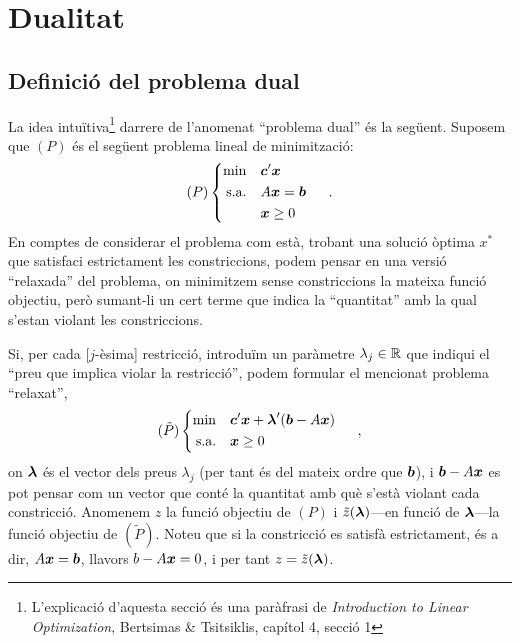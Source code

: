 \chapter{Dualitat}

\section{Definició del problema dual}

La idea intuïtiva\footnote{L'explicació d'aquesta secció és una paràfrasi de \textit{Introduction to Linear Optimization}, Bertsimas \& Tsitsiklis, capítol 4, secció 1} darrere de l'anomenat ``problema dual'' és la següent. Suposem que $(P)$ és el següent problema lineal de minimització:
\[
	(P)
	\begin{cases}
	\begin{aligned}
	\min 			&&& \boldsymbol{c}'\boldsymbol{x}\\
	\text{s.a.}		&&& A\boldsymbol{x} = \boldsymbol{b}\\
	&&& \boldsymbol{x}\ge0
	\end{aligned}
	\end{cases}\ .
\]
En comptes de considerar el problema com està, trobant una solució òptima $x^\ast$ que satisfaci estrictament les constriccions, podem pensar en una versió ``relaxada'' del problema, on minimitzem sense constriccions la mateixa funció objectiu, però sumant-li un cert terme que indica la ``quantitat'' amb la qual s'estan violant les constriccions. 

Si, per cada [$j$-èsima] restricció, introduïm un paràmetre $\lambda_j\in\mathbb{R}$ que indiqui el ``preu que implica violar la restricció'', podem formular el mencionat problema ``relaxat'',
\[
	(\tilde{P})
	\begin{cases}
	\begin{aligned}
	\min 			&&& \boldsymbol{c}'\boldsymbol{x} + \boldsymbol{\lambda}'(\boldsymbol{b}-A\boldsymbol{x})\\
	\text{s.a.}		&&& \boldsymbol{x} \ge 0\\
	\end{aligned}
	\end{cases}\ ,
\]
on $\boldsymbol{\lambda}$ és el vector dels preus $\lambda_j$ (per tant és del mateix ordre que $\boldsymbol{b}$), i $\boldsymbol{b}-A\boldsymbol{x}$ es pot pensar com un vector que conté la quantitat amb què s'està violant cada constricció. Anomenem $z$ la funció objectiu de $(P)$ i $\tilde{z}(\boldsymbol{\lambda})$---en funció de $\boldsymbol{\lambda}$---la funció objectiu de $(\tilde{P})$. Noteu que si la constricció es satisfà estrictament, és a dir, $A\boldsymbol{x}=\boldsymbol{b}$, llavors $b-A\boldsymbol{x} = 0$, i per tant $z = \tilde{z}(\boldsymbol{\lambda})$.

